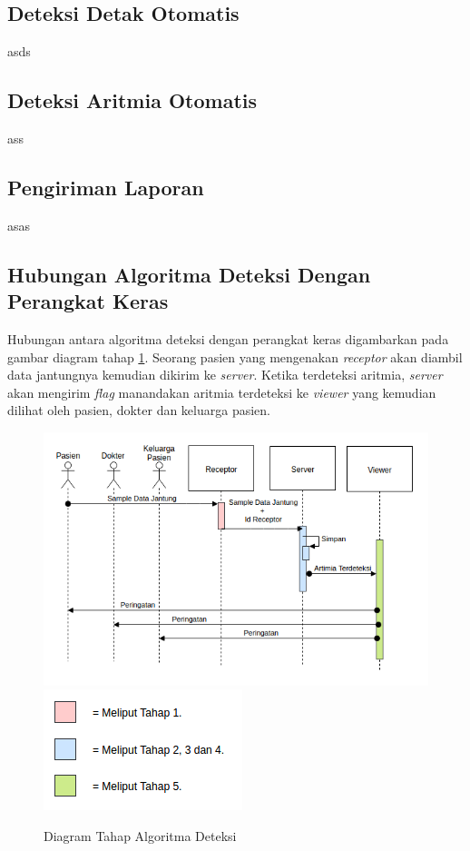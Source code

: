 \subsection{Deteksi Detak Otomatis}
asds

\subsection{Deteksi Aritmia Otomatis}
ass

\subsection{Pengiriman Laporan}
asas

\subsection{Hubungan Algoritma Deteksi Dengan Perangkat Keras}
Hubungan antara algoritma deteksi dengan perangkat keras digambarkan pada gambar diagram tahap \ref{fig_detect_algorithm2}. Seorang pasien yang mengenakan \textit{receptor} akan diambil data jantungnya kemudian dikirim ke \textit{server}. Ketika terdeteksi aritmia, \textit{server} akan mengirim \textit{flag} manandakan aritmia terdeteksi ke \textit{viewer} yang kemudian dilihat oleh pasien, dokter dan keluarga pasien.
\begin{figure}[H]
	\centering
	\includegraphics[scale=0.7]{images/sequence1.png}
	\includegraphics[scale=0.7]{images/sequence1_legend.png}	
	\caption{Diagram Tahap Algoritma Deteksi}
	\label{fig_detect_algorithm2}
\end{figure}

